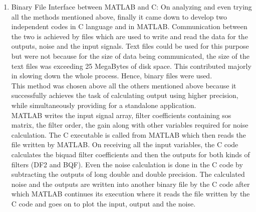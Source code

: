 \documentclass[colorlinks=true,pdfstartview=FitV,linkcolor=blue,
            citecolor=red,urlcolor=magenta]{ligodoc}
\begin{document}
\begin{enumerate}
			\item Binary File Interface between MATLAB and C: On analyzing and even trying all the methods mentioned above, finally it came down to develop two independent codes in C language and in MATLAB. Communication between the two is achieved by files which are used to write and read the data for the outputs, noise and the input signals. Text files could be used for this purpose but were not because for the size of data being communicated, the size of the text files was exceeding 25 MegaBytes of disk space. This contributed majorly in slowing down the whole process. Hence,  binary files were used. \\This method was chosen above all the others mentioned above because it successfully achieves the task of calculating output using higher precision, while simultaneously providing for a standalone application. \\
			MATLAB writes the input signal array, filter coefficients containing sos matrix, the filter order, the gain along with other variables required for noise calculation. The C executable is called from MATLAB which then reads the file written by MATLAB. On receiving all the input variables, the C code calculates the biquad filter coefficients and then the outputs for both kinds of filters (DF2 and BQF). Even the noise calculation is done in the C code by subtracting the outputs of long double and double precision. The calculated noise and the outputs are written into another binary file by the C code after which MATLAB continues its execution where it reads the file written by the C code and goes on to plot the input, output and the noise.  \\
		\end{enumerate}
\end{document}
